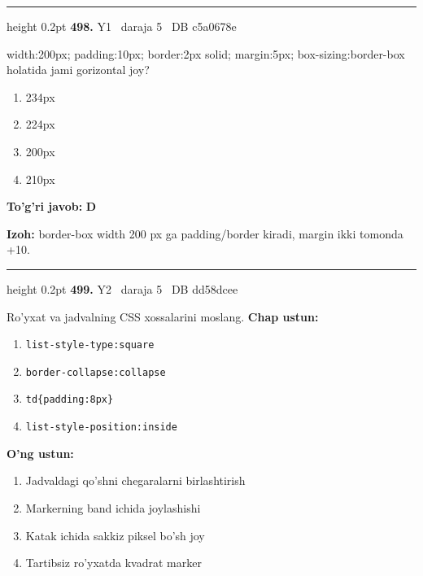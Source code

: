 \documentclass[10pt,a4paper,oneside]{article}
\begin{document}
\vspace{2mm}\hrule height 0.2pt \vspace{4mm}
\hypertarget{q498}{\textbf{\color{ink}498.}}  {\color{muted}\scriptsize Y1 \textbullet\ daraja 5 \textbullet\ DB c5a0678e}
\par
width:200px; padding:10px; border:2px solid; margin:5px; box-sizing:border-box holatida jami gorizontal joy?
\begin{enumerate}[label=\Alph*),leftmargin=9mm]
\item 234px
\item 224px
\item 200px
\item 210px
\end{enumerate}
\begin{tcolorbox}[enhanced,breakable,colback=teal!4,colframe=teal!45!black,boxrule=0.45pt,arc=1.2mm,left=2.8mm,right=2.8mm,top=2mm,bottom=2mm,before skip=2mm,after skip=2mm]
\textbf{\color{teal}To'g'ri javob:} \textbf{D}
\par\smallskip
\textbf{Izoh:} border-box width 200 px ga padding/border kiradi, margin ikki tomonda +10.
\end{tcolorbox}
\vspace{2mm}\hrule height 0.2pt \vspace{4mm}
\hypertarget{q499}{\textbf{\color{ink}499.}}  {\color{muted}\scriptsize Y2 \textbullet\ daraja 5 \textbullet\ DB dd58dcee}
\par
Ro'yxat va jadvalning CSS xossalarini moslang.
\textbf{\footnotesize Chap ustun:}
\begin{enumerate}[label=\arabic*),leftmargin=9mm]
\item \texttt{list-style-type:square}
\item \texttt{border-collapse:collapse}
\item \texttt{td\{padding:8px\}}
\item \texttt{list-style-position:inside}
\end{enumerate}
\textbf{\footnotesize O'ng ustun:}
\begin{enumerate}[label=\Alph*),leftmargin=9mm]
\item Jadvaldagi qo'shni chegaralarni birlashtirish
\item Markerning band ichida joylashishi
\item Katak ichida sakkiz piksel bo'sh joy
\item Tartibsiz ro'yxatda kvadrat marker
\end{enumerate}
\end{document}
